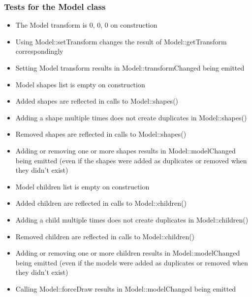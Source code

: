 \subsubsection*{Tests for the Model class}
\begin{itemize}
    \item The Model transform is 0, 0, 0 on construction
    \item Using Model::setTransform changes the result of Model::getTransform correspondingly
    \item Setting Model transform results in Model::transformChanged being emitted
    \item Model shapes list is empty on construction
    \item Added shapes are reflected in calls to Model::shapes()
    \item Adding a shape multiple times does not create duplicates in Model::shapes()
    \item Removed shapes are reflected in calls to Model::shapes()
    \item Adding or removing one or more shapes results in Model::modelChanged being emitted (even if the shapes were added as duplicates or removed when they didn't exist)
    \item Model children list is empty on construction
    \item Added children are reflected in calls to Model::children()
    \item Adding a child multiple times does not create duplicates in Model::children()
    \item Removed children are reflected in calls to Model::children()
    \item Adding or removing one or more children results in Model::modelChanged being emitted (even if the models were added as duplicates or removed when they didn't exist)
    \item Calling Model::forceDraw results in Model::modelChanged being emitted
\end{itemize}
